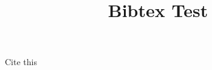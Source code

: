 \documentclass[a4paper,10pt]{article}
\title{Bibtex Test}
\begin{document}
Cite this\cite{testcite}



\end{document}
